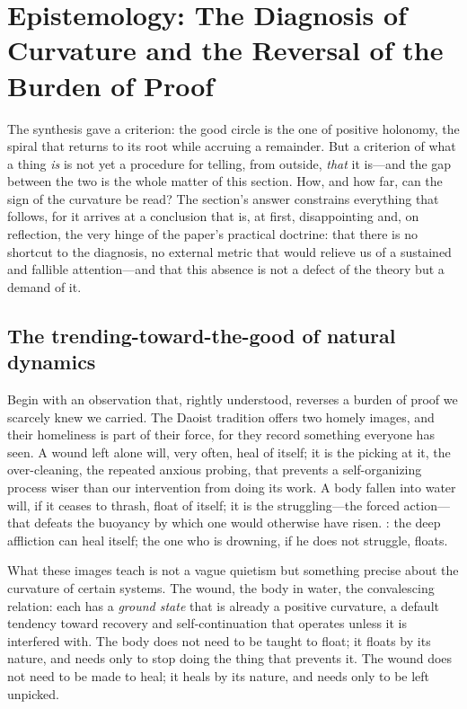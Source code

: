 \section{Epistemology: The Diagnosis of Curvature and the Reversal of the Burden of Proof}
\label{p09:sec:epistemology}

\noindent
The synthesis gave a criterion: the good circle is the one of positive holonomy, the spiral that returns to its root while accruing a remainder. But a criterion of what a thing \emph{is} is not yet a procedure for telling, from outside, \emph{that} it is---and the gap between the two is the whole matter of this section. How, and how far, can the sign of the curvature be read? The section's answer constrains everything that follows, for it arrives at a conclusion that is, at first, disappointing and, on reflection, the very hinge of the paper's practical doctrine: that there is no shortcut to the diagnosis, no external metric that would relieve us of a sustained and fallible attention---and that this absence is not a defect of the theory but a demand of it.

\subsection{The trending-toward-the-good of natural dynamics}
\label{p09:sec:trending}

Begin with an observation that, rightly understood, reverses a burden of proof we scarcely knew we carried. The Daoist tradition offers two homely images, and their homeliness is part of their force, for they record something everyone has seen. A wound left alone will, very often, heal of itself; it is the picking at it, the over-cleaning, the repeated anxious probing, that prevents a self-organizing process wiser than our intervention from doing its work. A body fallen into water will, if it ceases to thrash, float of itself; it is the struggling---the forced action---that defeats the buoyancy by which one would otherwise have risen. : the deep affliction can heal itself; the one who is drowning, if he does not struggle, floats.

What these images teach is not a vague quietism but something precise about the curvature of certain systems. The wound, the body in water, the convalescing relation: each has a \emph{ground state} that is already a positive curvature, a default tendency toward recovery and self-continuation that operates unless it is interfered with. The body does not need to be taught to float; it floats by its nature, and needs only to stop doing the thing that prevents it. The wound does not need to be made to heal; it heals by its nature, and needs only to be left unpicked. 

